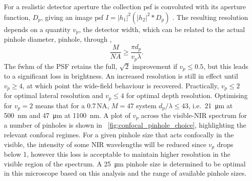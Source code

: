 \documentclass{article}
\begin{document}
For a realistic detector aperture the collection \gls{psf} is convoluted with its aperture function, $D_p$, giving an image \gls{psf} $I=|h_1|^2(|h_2|^2\ast D_p)$ \cite{wilson1987size}. The resulting resolution depends on a quantity $v_p$, the detector width, which can be related to the actual pinhole diameter, \gls{pinhole}, through \cite{wilson1987size},
\begin{equation}
	\frac{M}{\mathit{NA}}\geq\frac{\pi d_p}{v_p\lambda}.
\end{equation}
The \gls{fwhm} of the PSF retains the full, $\sqrt{2}$ improvement if $v_p\leq0.5$, but this leads to a significant loss in brightness. An increased resolution is still in effect until $v_p\geq4$, at which point the wide-field behaviour is recovered. Practically, $v_p\leq2$ for optimal lateral resolution and $v_p\leq4$ for optimal depth resolution. Optimising for $v_p=2$ means that for a 0.7\,NA, $M=47$ system $d_p/\lambda\leq43$, i.e.\ \SI{21}{\micro\metre} at \SI{500}{nm} and \SI{47}{\micro\metre} at \SI{1100}{nm}. A plot of $v_p$ across the visible-NIR spectrum for a number of pinholes is shown in \figurename~\ref{fig:confocal_pinhole_choice}, highlighting the relevant confocal regimes. For a given pinhole size that acts confocally in the visible, the intensity of some NIR wavelengths will be reduced since $v_p$ drops below 1, however this loss is acceptable to maintain higher resolution in the visible region of the spectrum. A \SI{25}{\micro\metre} pinhole size is determined to be optimal in this microscope based on this analysis and the range of available pinhole sizes.
\end{document}

